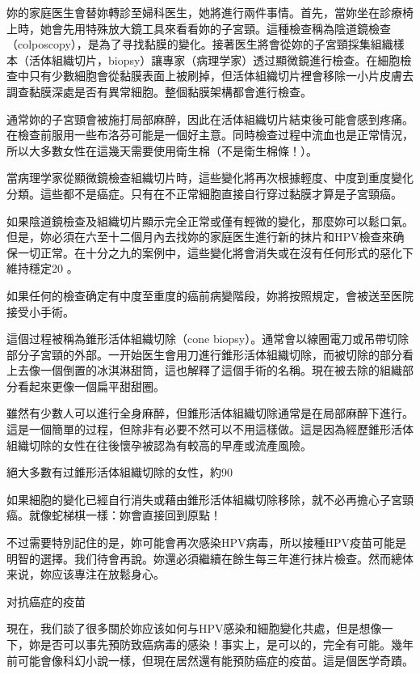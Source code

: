 \documentclass[12pt,UTF8]{ctexbook}
\begin{document}
妳的家庭医生會替妳轉診至婦科医生，她將進行兩件事情。首先，當妳坐在診療椅上時，她會先用特殊放大鏡工具來看看妳的子宮頸。這種檢查稱為陰道鏡檢查（colposcopy），是為了寻找黏膜的變化。接著医生將會從妳的子宮頸採集組織樣本（活体組織切片，biopsy）讓專家（病理学家）透过顯微鏡進行檢查。在細胞檢查中只有少數細胞會從黏膜表面上被刷掉，但活体組織切片裡會移除一小片皮膚去調查黏膜深處是否有異常細胞。整個黏膜架構都會進行檢查。

通常妳的子宮頸會被施打局部麻醉，因此在活体組織切片結束後可能會感到疼痛。在檢查前服用一些布洛芬可能是一個好主意。同時檢查过程中流血也是正常情況，所以大多數女性在這幾天需要使用衛生棉（不是衛生棉條！）。

當病理学家從顯微鏡檢查組織切片時，這些變化將再次根據輕度、中度到重度變化分類。這些都不是癌症。只有在不正常細胞直接自行穿过黏膜才算是子宮頸癌。

如果陰道鏡檢查及組織切片顯示完全正常或僅有輕微的變化，那麼妳可以鬆口氣。但是，妳必須在六至十二個月內去找妳的家庭医生進行新的抹片和HPV檢查來确保一切正常。在十分之九的案例中，這些變化將會消失或在沒有任何形式的惡化下維持穩定20 。

如果任何的檢查确定有中度至重度的癌前病變階段，妳將按照規定，會被送至医院接受小手術。

這個过程被稱為錐形活体組織切除（cone biopsy）。通常會以線圈電刀或吊帶切除部分子宮頸的外部。一开始医生會用刀進行錐形活体組織切除，而被切除的部分看上去像一個倒置的冰淇淋甜筒，這也解釋了這個手術的名稱。現在被去除的組織部分看起來更像一個扁平甜甜圈。

雖然有少數人可以進行全身麻醉，但錐形活体組織切除通常是在局部麻醉下進行。這是一個簡單的过程，但除非有必要不然可以不用這樣做。這是因為經歷錐形活体組織切除的女性在往後懷孕被認為有較高的早產或流產風險。

絕大多數有过錐形活体組織切除的女性，約90%

如果細胞的變化已經自行消失或藉由錐形活体組織切除移除，就不必再擔心子宮頸癌。就像蛇梯棋一樣：妳會直接回到原點！

不过需要特別記住的是，妳可能會再次感染HPV病毒，所以接種HPV疫苗可能是明智的選擇。我们待會再說。妳還必須繼續在餘生每三年進行抹片檢查。然而總体来说，妳应该專注在放鬆身心。





对抗癌症的疫苗




現在，我们談了很多關於妳应该如何与HPV感染和細胞變化共處，但是想像一下，妳是否可以事先預防致癌病毒的感染！事实上，是可以的，完全有可能。幾年前可能會像科幻小說一樣，但現在居然還有能預防癌症的疫苗。這是個医学奇蹟。
\end{document}
